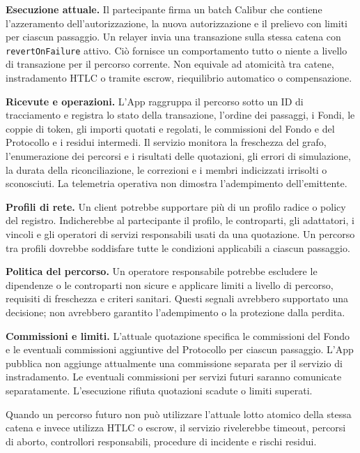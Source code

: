 \documentclass[11pt]{article}
\begin{document}
\textbf{Esecuzione attuale.} Il partecipante firma un batch Calibur che contiene l'azzeramento dell'autorizzazione, la nuova autorizzazione e il prelievo con limiti per ciascun passaggio. Un relayer invia una transazione sulla stessa catena con \texttt{revertOnFailure} attivo. Ciò fornisce un comportamento tutto o niente a livello di transazione per il percorso corrente. Non equivale ad atomicità tra catene, instradamento HTLC o tramite escrow, riequilibrio automatico o compensazione.

\textbf{Ricevute e operazioni.} L'App raggruppa il percorso sotto un ID di tracciamento e registra lo stato della transazione, l'ordine dei passaggi, i Fondi, le coppie di token, gli importi quotati e regolati, le commissioni del Fondo e del Protocollo e i residui intermedi. Il servizio monitora la freschezza del grafo, l'enumerazione dei percorsi e i risultati delle quotazioni, gli errori di simulazione, la durata della riconciliazione, le correzioni e i membri indicizzati irrisolti o sconosciuti. La telemetria operativa non dimostra l'adempimento dell'emittente.

\textbf{Profili di rete.} Un client potrebbe supportare più di un profilo radice o policy del registro. Indicherebbe al partecipante il profilo, le controparti, gli adattatori, i vincoli e gli operatori di servizi responsabili usati da una quotazione. Un percorso tra profili dovrebbe soddisfare tutte le condizioni applicabili a ciascun passaggio.

\textbf{Politica del percorso.} Un operatore responsabile potrebbe escludere le dipendenze o le controparti non sicure e applicare limiti a livello di percorso, requisiti di freschezza e criteri sanitari. Questi segnali avrebbero supportato una decisione; non avrebbero garantito l'adempimento o la protezione dalla perdita.

\textbf{Commissioni e limiti.} L'attuale quotazione specifica le commissioni del Fondo e le eventuali commissioni aggiuntive del Protocollo per ciascun passaggio. L'App pubblica non aggiunge attualmente una commissione separata per il servizio di instradamento. Le eventuali commissioni per servizi futuri saranno comunicate separatamente. L'esecuzione rifiuta quotazioni scadute o limiti superati.

Quando un percorso futuro non può utilizzare l'attuale lotto atomico della stessa catena e invece utilizza HTLC o escrow, il servizio rivelerebbe timeout, percorsi di aborto, controllori responsabili, procedure di incidente e rischi residui.
\end{document}
